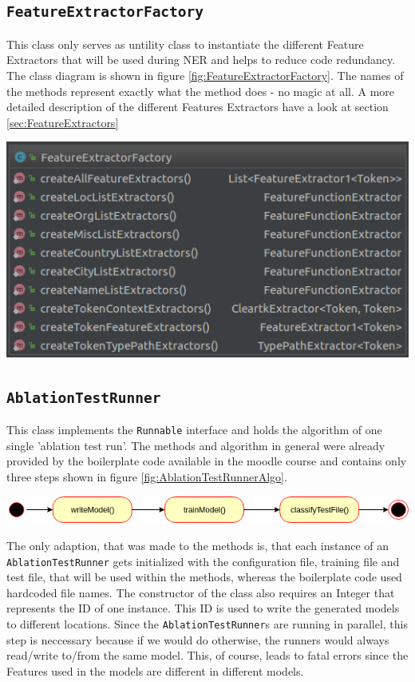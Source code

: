 \documentclass[11pt, english]{article}
\begin{document}
\subsection{\texttt{FeatureExtractorFactory}}
\label{sec:FeatureExtractorFactory}
This class only serves as untility class to instantiate the different Feature Extractors that will be used during NER and helps to reduce code redundancy. The class diagram is shown in figure \ref{fig:FeatureExtractorFactory}. The names of the methods represent exactly what the method does - no magic at all. A more detailed description of the different Features Extractors have a look at section \ref{sec:FeatureExtractors}

\includegraphics[scale=0.5]{gfx/FeatureExtractorFactory.png}
\label{fig:FeatureExtractorFactory}

\subsection{\texttt{AblationTestRunner}}
\label{sec:AblationTestRunner}
This class implements the \verb/Runnable/ interface and holds the algorithm of one single 'ablation test run'. The methods and algorithm in general were already provided by the boilerplate code available in the moodle course and contains only three steps shown in figure \ref{fig:AblationTestRunnerAlgo}. 

\includegraphics[scale=0.5]{gfx/ablationRunnerAlgo.png}
\label{fig:AblationTestRunnerAlgo}

The only adaption, that was made to the methods is, that each instance of an \verb/AblationTestRunner/ gets initialized with the configuration file, training file and test file, that will be used within the methods, whereas the boilerplate code used hardcoded file names. The constructor of the class also requires an Integer that represents the ID of one instance. This ID is used to write the generated models to different locations. Since the \verb/AblationTestRunner/s are running in parallel, this step is neccessary because if we would do otherwise, the runners would always read/write to/from the same model. This, of course, leads to fatal errors since the Features used in the models are different in different models.
\end{document}
